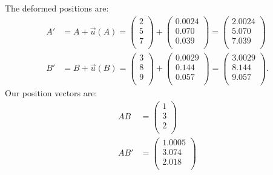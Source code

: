 \begin{derivation}
  The deformed positions are:
  \begin{align*}
    A' &= A + \Vec{u}(A) = \begin{pmatrix}
      2\\
    5\\
    7\\
    \end{pmatrix} + \begin{pmatrix}
      \num{0,0024} \\
    \num{0,070} \\
    \num{0,039} \\
    \end{pmatrix} = \begin{pmatrix}
      \num{2,0024} \\
    \num{5,070} \\
    \num{7,039} \\
    \end{pmatrix} \\
      B' &= B + \Vec{u}(B) = \begin{pmatrix}
        3\\
      8\\
      9\\
      \end{pmatrix} + \begin{pmatrix}
        \num{0,0029} \\
      \num{0,144} \\
      \num{0,057} \\
      \end{pmatrix} = \begin{pmatrix}
        \num{3,0029} \\
      \num{8,144} \\
      \num{9,057} \\
      \end{pmatrix}
  .\end{align*}
  Our position vectors are:
  \begin{align*}
    AB &= \begin{pmatrix}
      1\\
    3\\
    2\\
    \end{pmatrix} \\
    AB' &= \begin{pmatrix}
     1.0005 \\
     3.074 \\
     2.018 \\
    \end{pmatrix}

\end{align*}
\end{derivation}
